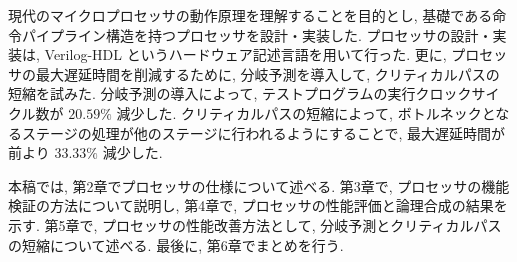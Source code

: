 \documentclass[../main.tex]{subfiles}
\begin{document}
  現代のマイクロプロセッサの動作原理を理解することを目的とし, 
  基礎である命令パイプライン構造を持つプロセッサを設計・実装した.
  プロセッサの設計・実装は, Verilog-HDL というハードウェア記述言語を用いて行った.
  更に, プロセッサの最大遅延時間を削減するために, 
  分岐予測を導入して, クリティカルパスの短縮を試みた.
  分岐予測の導入によって, テストプログラムの実行クロックサイクル数が $20.59\%$ 減少した.
  クリティカルパスの短縮によって, 
  ボトルネックとなるステージの処理が他のステージに行われるようにすることで, 
  最大遅延時間が前より $33.33\%$ 減少した.

  本稿では, 第2章でプロセッサの仕様について述べる.
  第3章で, プロセッサの機能検証の方法について説明し, 
  第4章で, プロセッサの性能評価と論理合成の結果を示す.
  第5章で, プロセッサの性能改善方法として, 分岐予測とクリティカルパスの短縮について述べる.
  最後に, 第6章でまとめを行う.
\end{document}
